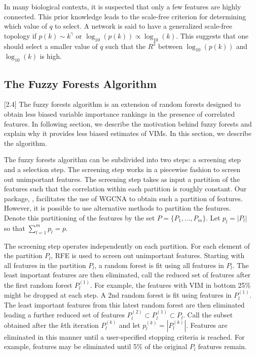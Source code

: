 \documentclass[article,shortnames]{jss}
\begin{document}
In many biological contexts, it is suspected that only a few features are highly connected.  This prior knowledge leads to the scale-free criterion for
determining which value of $q$ to select.  A network is said to have a generalized scale-free topology if $p(k) \sim k^{\gamma}$ or
 $\log_{10}(p(k)) \propto \log_{10}(k)$\citep{zhang2005general}.  This suggests that one should select a smaller value of $q$ such that the $R^{2}$ between 
  $\log_{10}(p(k))$ and $\log_{10}(k)$ is high.
  
\subsection{The Fuzzy Forests Algorithm}[2.4]
The fuzzy forests algorithm is an extension of random forests designed to obtain less biased variable importance rankings in the presence
of correlated features.  In following section, we describe the motivation behind fuzzy forests and explain why it
provides less biased estimates of VIMs.  In this section, we describe the algorithm.

The fuzzy forests algorithm can be subdivided into two steps: a screening step and a selection step.  The screening step works in a piecewise fashion
to screen out unimportant features.  The screening step takes as input a partition of the features such that the correlation within each partition is 
roughly constant.  Our package, , facilitates the use of WGCNA to obtain such a partition of features.  However, 
it is possible to use alternative methods to partition the features.  Denote this partitioning of the features by the set $P=\{P_{1},\ldots,P_{m}\}$.
Let $p_{l}=|P_{l}|$ so that $\sum_{l=1}^{m}p_{l}=p$.

The screening step operates independently on each partition.  For each element of the partition $P_{l}$, RFE
is used to screen out unimportant features.  Starting with all features in the partition $P_{l}$, a random forest is fit using all
features in $P_{l}$.  The least important features are then eliminated, call the reduced set of features after the first random forest $P_{l}^{(1)}$.  
For example, the features with VIM in bottom 25\% might be dropped at each step. 
A 2nd random forest is fit using features in $P_{l}^{(1)}$.  The least important features from this latest random forest are then eliminated leading a
further reduced set of features $P_{l}^{(2)} \subset P_{l}^{(1)} \subset P_{l}$.  Call the subset obtained after the $k$th iteration $P_{l}^{(k)}$ and let
$p^{(k)}_{l}=|P_{l}^{(k)}|$.
Features are eliminated in this manner until a user-specified 
stopping criteria is reached.  For example, features may be eliminated until 5\% of the original $P_{l}$ features remain.  
\end{document}
